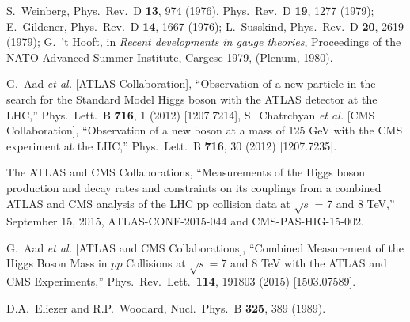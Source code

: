 \documentclass[11pt]{article}
\begin{document}
\begin{thebibliography}{999}
\baselineskip11.75pt
\parskip-1pt

S.~Weinberg, 
  Phys.\ Rev.\ D {\bf 13}, 974 (1976),
  Phys.\ Rev.\ D {\bf 19}, 1277 (1979);
E.~Gildener,
  Phys.\ Rev.\ D {\bf 14}, 1667 (1976);
L.~Susskind, 
  Phys.\ Rev.\ D {\bf 20}, 2619 (1979);
G.~'t Hooft, in {\it Recent developments in gauge theories}, Proceedings 
of the NATO Advanced Summer Institute, Cargese 1979, (Plenum, 1980).

G.~Aad {\it et al.}  [ATLAS Collaboration],
  ``Observation of a new particle in the search for the Standard Model
  Higgs boson with the ATLAS detector at the LHC,''
  Phys.\ Lett.\ B {\bf 716}, 1 (2012)
  [1207.7214],
  S.~Chatrchyan {\it et al.}  [CMS Collaboration],
  ``Observation of a new boson at a mass of 125 GeV with the CMS experiment
  at the LHC,''
  Phys.\ Lett.\ B {\bf 716}, 30 (2012)
  [1207.7235].

  The ATLAS and CMS Collaborations,
  ``Measurements of the Higgs boson production and decay rates and constraints 
  on its   couplings from a combined ATLAS and CMS analysis of the LHC pp 
  collision data at $\sqrt{s}$ = 7 and 8 TeV,''
  September 15, 2015,
  ATLAS-CONF-2015-044 and CMS-PAS-HIG-15-002.

  G.~Aad {\it et al.} [ATLAS and CMS Collaborations],
  ``Combined Measurement of the Higgs Boson Mass in $pp$ Collisions at 
  $\sqrt{s}=7$ and 8    TeV with the ATLAS and CMS Experiments,''
  Phys.\ Rev.\ Lett.\ {\bf 114}, 191803 (2015)
  [1503.07589].
  
D.A.~Eliezer and R.P.~Woodard,
  Nucl.\ Phys.\ B {\bf 325}, 389 (1989).


\end{thebibliography}
\end{document}
